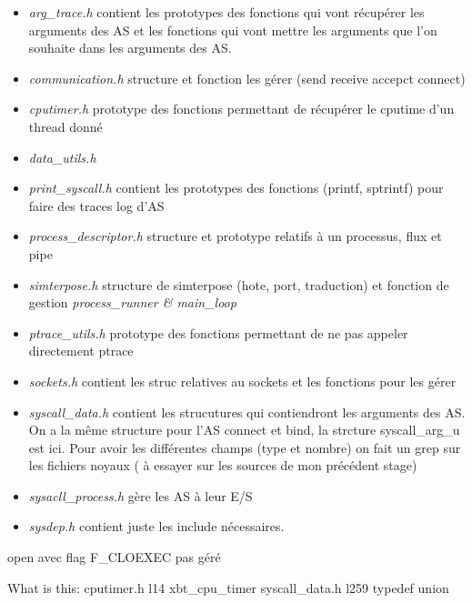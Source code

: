\documentclass{article}
\begin{document}
\begin{itemize}
\item \textit{{\color{brown}arg\_trace.h}} contient les prototypes des fonctions
  qui vont récupérer les arguments des AS et les fonctions qui vont mettre les
  arguments que l'on souhaite dans les arguments des AS.
\item \textit{communication.h} structure et fonction les gérer (send receive
  accepct connect)
\item \textit{cputimer.h} prototype des fonctions permettant de récupérer le
  cputime d'un thread donné
\item \textit{{\color{red} data\_utils.h}}
\item \textit{print\_syscall.h} contient les prototypes des fonctions (printf,
  sptrintf) pour faire des traces log d'AS
\item \textit{{\color{brown}process\_descriptor.h}} structure et prototype
  relatifs à un processus, flux et pipe
\item \textit{simterpose.h} structure de simterpose (hote, port, traduction) et
  fonction de gestion \textit{process\_runner \& main\_loop}
\item \textit{ptrace\_utils.h} prototype des fonctions permettant de ne pas
  appeler directement ptrace
\item \textit{sockets.h} contient les struc relatives au sockets et les
  fonctions pour les gérer
\item \textit{{\color{brown}syscall\_data.h}} contient les strucutures qui
  contiendront les arguments des AS. On a la même structure pour l'AS connect et
  bind, la strcture {\color{red} syscall\_arg\_u} est ici. Pour avoir les
  différentes champs (type et nombre) on fait un grep sur les fichiers noyaux (
  {\color{red} à essayer sur les sources de mon précédent stage})
\item \textit{{\color{brown} sysacll\_process.h }} gère les AS à leur E/S
\item \textit{sysdep.h} contient juste les include nécessaires.
\end{itemize}

open avec flag F\_CLOEXEC pas géré

\begin{tikzpicture}

\end{tikzpicture}

What is this: cputimer.h l14 {\color{purple} xbt\_cpu\_timer} syscall\_data.h
l259 {\color{purple} typedef union}
\end{document}
